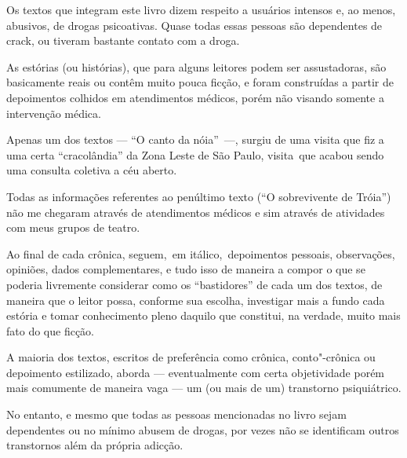  

Os textos que integram este livro dizem respeito a usuários intensos e,
ao menos, abusivos, de drogas psicoativas. Quase todas essas pessoas são
dependentes de crack, ou tiveram bastante contato com a droga.

As estórias (ou histórias), que para alguns leitores podem ser
assustadoras, são basicamente reais ou contêm muito pouca ficção, e
foram construídas a partir de depoimentos colhidos em atendimentos
médicos, porém não visando somente a intervenção médica.

Apenas um dos textos --- ``O canto da nóia''~\mbox{---,} surgiu de uma visita
que fiz a uma certa ``cracolândia'' da Zona Leste de São Paulo,
visita~que acabou sendo uma consulta coletiva a céu aberto.

Todas as informações referentes ao penúltimo texto (``O sobrevivente de
Tróia'') não me chegaram através de atendimentos médicos e sim através
de atividades com meus grupos de teatro.

Ao final de cada crônica, seguem,~em itálico,~depoimentos pessoais,
observações, opiniões, dados complementares, e tudo isso de maneira a
compor o que se poderia livremente considerar como os ``bastidores'' de
cada um dos textos, de maneira que o leitor possa, conforme sua escolha,
investigar mais a fundo cada estória e tomar conhecimento pleno daquilo
que constitui, na verdade, muito mais fato do que ficção.

A maioria dos textos, escritos de preferência como crônica,
conto"-crônica ou depoimento estilizado, aborda --- eventualmente com
certa objetividade porém mais comumente de maneira vaga --- um (ou mais
de um) transtorno psiquiátrico.

No entanto, e mesmo que todas as pessoas mencionadas no livro sejam
dependentes ou no mínimo abusem de drogas, por vezes não se identificam
outros transtornos além da própria adicção.

 
